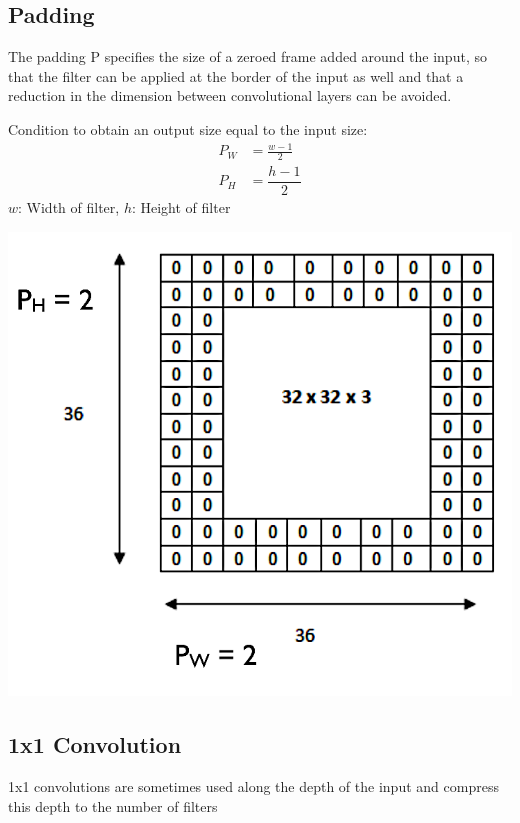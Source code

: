 \documentclass[11pt]{article}
\begin{document}
\subsection{Padding}
\begin{minipage}{0.6\linewidth}
	The padding P specifies the size of a zeroed frame added around the input, so that the filter can be applied at the border of the input as well and that a reduction in the dimension between convolutional layers can be avoided.
	
	Condition to obtain an output size equal to the input size:
	\begin{align*}
		P_W &= \frac{w-1}{2}\\
		P_H &= \dfrac{h-1}{2}
	\end{align*}
	$w$: Width of filter, $h$: Height of filter
\end{minipage}
\begin{minipage}{0.4\linewidth}
	\centering
	\includegraphics[width=\linewidth]{img/convolutional_layer_kernels_padding}
\end{minipage}

\subsection{1x1 Convolution}
1x1 convolutions are sometimes used along the depth of the input and compress this depth to the number of filters
\end{document}
